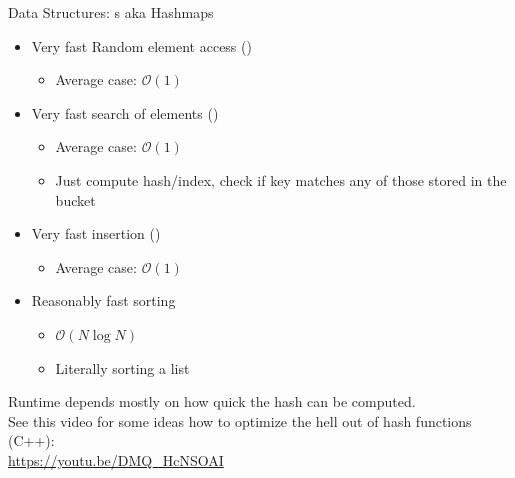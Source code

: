 \begin{frame}{Data Structures: s aka Hashmaps}
%
\begin{itemize}
\item Very fast Random element access ()
	\begin{itemize}
	\item Average case: $\mathcal{O}(1)$
	\end{itemize}
\item Very fast search of elements ()
	\begin{itemize}
	\item Average case: $\mathcal{O}(1)$
	\item Just compute hash/index, check if key matches any of those stored in the bucket
	\end{itemize}
\item Very fast insertion ()
	\begin{itemize}
	\item Average case: $\mathcal{O}(1)$
	\end{itemize}
\item Reasonably fast sorting 
	\begin{itemize}
	\item $\mathcal{O}(N \log N)$
	\item Literally sorting a list
	\end{itemize}
\end{itemize}
%
\begin{hintbox}
\footnotesize
Runtime depends mostly on how quick the hash can be computed.\\
See this video for some ideas how to optimize the hell out of hash functions (C++):\\
\url{https://youtu.be/DMQ_HcNSOAI}
\end{hintbox}
%
\end{frame}


